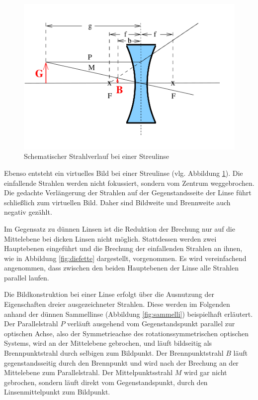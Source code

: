 \begin{figure}
  \includegraphics[width=\linewidth]{Bilder/streulinse.png}
  \caption{Schematischer Strahlverlauf bei einer Streulinse \cite{Anleitung}}
  \label{fig:streuli}
\end{figure}
Ebenso entsteht ein virtuelles Bild bei einer Streulinse (vlg. Abbildung \ref{fig:streuli}).
Die einfallende Strahlen werden nicht fokussiert, sondern vom Zentrum weggebrochen. Die gedachte Verlängerung der Strahlen auf der Gegenstandsseite der Linse führt schließlich zum virtuellen Bild. Daher sind Bildweite und Brennweite auch negativ gezählt.

Im Gegensatz zu dünnen Linsen ist die Reduktion der Brechung nur auf die Mittelebene bei dicken Linsen nicht möglich. Stattdessen werden zwei Hauptebenen eingeführt und die Brechung der einfallenden Strahlen an ihnen, wie in Abbildung \ref{fig:diefette} dargestellt, vorgenommen.
Es wird vereinfachend angenommen, dass zwischen den beiden Hauptebenen der Linse alle Strahlen parallel laufen.

Die Bildkonstruktion bei einer Linse erfolgt über die Ausnutzung der Eigenschaften dreier ausgezeichneter Strahlen. Diese werden im Folgenden anhand der dünnen Sammellinse (Abbildung \ref{fig:sammelli}) beispielhaft erläutert.
Der Parallelstrahl $P$ verläuft ausgehend vom Gegenstandspunkt parallel zur optischen Achse, also der Symmetrieachse des rotationssymmetrischen optischen Systems, wird an der Mittelebene gebrochen, und läuft bildseitig als Brennpunktstrahl durch selbigen zum Bildpunkt.
Der Brennpunktstrahl $B$ läuft gegenstandsseitig durch den Brennpunkt und wird nach der Brechung an der Mittelebene zum Parallelstrahl.
Der Mittelpunktsstrahl $M$ wird gar nicht gebrochen, sondern läuft direkt vom Gegenstandspunkt, durch den Linsenmittelpunkt zum Bildpunkt.

